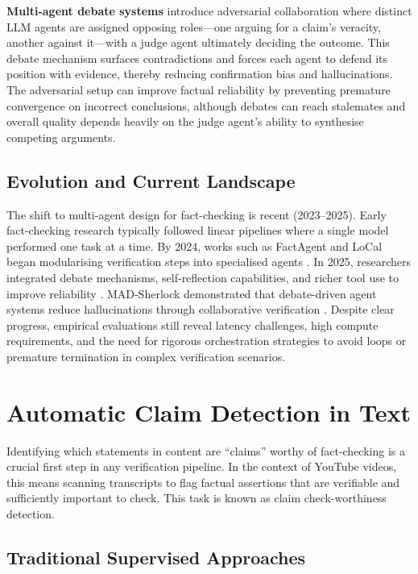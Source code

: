 \documentclass[12pt,a4paper]{article}
\begin{document}
\textbf{Multi-agent debate systems} \citep{ma2025guided, lakara2025madsherlock} introduce adversarial collaboration where distinct LLM agents are assigned opposing roles—one arguing for a claim's veracity, another against it—with a judge agent ultimately deciding the outcome. This debate mechanism surfaces contradictions and forces each agent to defend its position with evidence, thereby reducing confirmation bias and hallucinations. The adversarial setup can improve factual reliability by preventing premature convergence on incorrect conclusions, although debates can reach stalemates and overall quality depends heavily on the judge agent's ability to synthesise competing arguments.

\subsection{Evolution and Current Landscape}

The shift to multi-agent design for fact-checking is recent (2023–2025). Early fact-checking research typically followed linear pipelines where a single model performed one task at a time. By 2024, works such as FactAgent and LoCal began modularising verification steps into specialised agents \citep{hysonlab2025factagent, chen2024local}. In 2025, researchers integrated debate mechanisms, self-reflection capabilities, and richer tool use to improve reliability \citep{ma2025guided, icwsm2025workshop, tian2024webagents}. MAD-Sherlock demonstrated that debate-driven agent systems reduce hallucinations through collaborative verification \citep{lakara2025madsherlock}. Despite clear progress, empirical evaluations still reveal latency challenges, high compute requirements, and the need for rigorous orchestration strategies to avoid loops or premature termination in complex verification scenarios.

\section{Automatic Claim Detection in Text}

Identifying which statements in content are ``claims'' worthy of fact-checking is a crucial first step in any verification pipeline. In the context of YouTube videos, this means scanning transcripts to flag factual assertions that are verifiable and sufficiently important to check. This task is known as claim check-worthiness detection.

\subsection{Traditional Supervised Approaches}
\end{document}
